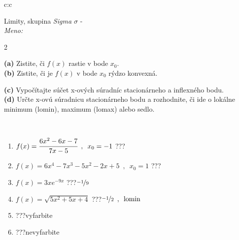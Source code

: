 \documentclass[10pt]{report}
\begin{document}
\begin{tabular}{c:c}
\begin{minipage}[c][104.5mm][t]{0.5\linewidth}
\begin{center}
\vspace{7mm}
{\huge Limity, skupina \textit{Sigma $\sigma$} -}\\[5mm]
\textit{Meno:}\phantom{xxxxxxxxxxxxxxxxxxxxxxxxxxxxxxxxxxxxxxxxxxxxxxxxxxxxxxxxxxxxxxxxx}\\[5mm]
\begin{minipage}{0.95\linewidth}
\begin{center}
{\small \begin{multicols}{2} \raggedright
\textbf{(a)} Zistite, či \(f(x)\) rastie v bode \(x_0\). \\[1mm]
\textbf{(b)} Zistite, či je \(f(x)\) v bode \(x_0\) rýdzo konvexná. \par \columnbreak
\textbf{(c)} Vypočítajte súčet x-ových súradníc stacionárneho a inflexného bodu. \\[1mm]
\textbf{(d)} Určte x-ovú súradnicu stacionárneho bodu a rozhodnite, či ide o lokálne minimum (lomin), maximum (lomax) alebo sedlo. \\[1mm]
\end{multicols}
}
\end{center}
\end{minipage}
\\[4mm]
\begin{minipage}{0.79\linewidth}
\begin{center}
\begin{varwidth}{\linewidth}
\begin{enumerate}
\normalsize
\item $f(x)=\cfrac{6x^2-6x-7}{7x-5}\enspace , \enspace x_0=-1$\quad \dotfill\; ???\;\dotfill \quad {}
\item $f(x)=6x^4-7x^3-5x^2-2x+5\enspace , \enspace x_0=1$\quad \dotfill\; ???\;\dotfill \quad {}
\item $f(x)=3xe^{-9x}$\quad \dotfill\; ???\;\dotfill \quad $\nicefrac{-1}{9}$
\item $f(x)=\sqrt{5x^2+5x+4}$\quad \dotfill\; ???\;\dotfill \quad $\nicefrac{-1}{2}\enspace , \enspace\text{lomin}$
\item \quad \dotfill\; ???\;\dotfill \quad vyfarbite
\item \quad \dotfill\; ???\;\dotfill \quad nevyfarbite
\end{enumerate}
\end{varwidth}

\end{center}
\end{minipage}
\end{center}
\end{minipage}
\end{tabular}
\end{document}
